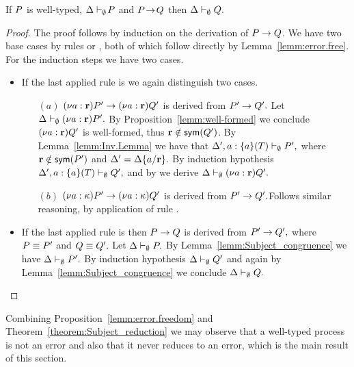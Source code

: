\begin{theorem}\label{theorem:Subject_reduction}
If $P$ is well-typed, $ \Delta\vdash_\emptyset\! P$ and $P\!\rightarrow\!Q$ then $ \Delta\vdash_\emptyset Q.$
\end{theorem}
\begin{proof}
The proof follows by induction on the derivation of $P\rightarrow Q$.
We have two base cases by rules  or , both of which follow directly by Lemma~\ref{lemm:error.free}. 
For the induction steps we have two cases.
\begin{itemize}
\item If the last applied rule is  we again distinguish two cases.
	\begin{itemize}
	\item [$(a)$] $(\nu a: {\mathbf{r}}) P' \rightarrow (\nu a: {\mathbf{r}}) Q'$ is derived from $ P' \rightarrow  Q'.$ Let $ \Delta\vdash_\emptyset (\nu a: {\mathbf{r}}) P'.$ By Proposition~\ref{lemm:well-formed} we conclude $(\nu a: {\mathbf{r}}) Q'$ is well-formed, thus ${\mathbf{r}}\notin\mathsf{sym}(Q')$.
By Lemma~\ref{lemm:Inv.Lemma} we have that $ \Delta', a: \{a\}(T) \vdash_\emptyset P',$ where  ${\mathbf{r}}\notin\mathsf{sym}(P')$ and $\Delta'=\Delta\{a/{\mathbf{r}}\}.$ By induction hypothesis $ \Delta', a: \{a\}(T) \vdash_\emptyset Q',$ and by  we derive $ \Delta\vdash_\emptyset (\nu a: {\mathbf{r}}) Q'.$ 
	\item [$(b)$] $(\nu a: {\mathbf{\kappa}}) P' \rightarrow (\nu a: {\mathbf{\kappa}}) Q'$ is derived from $ P' \rightarrow  Q'.$Follows similar reasoning, by application of rule .
	\end{itemize} 
\item If the last applied rule is  then $ P \rightarrow Q$ is derived from $ P' \rightarrow  Q',$ where $P\equiv P'$ and $Q\equiv Q'.$ Let $ \Delta\vdash_\emptyset P.$ By Lemma~\ref{lemm:Subject_congruence} we have $ \Delta\vdash_\emptyset P'.$ By induction hypothesis $ \Delta\vdash_\emptyset Q'$ and again by Lemma~\ref{lemm:Subject_congruence} we conclude $ \Delta\vdash_\emptyset Q.$
\end{itemize}
\end{proof}



Combining Proposition~\ref{lemm:error.freedom} and Theorem~\ref{theorem:Subject_reduction} we may observe that a well-typed process is not an error and also that it never reduces to an error, which is the main result of this section.
 
